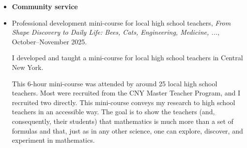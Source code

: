 \documentclass[12pt]{article}
\theoremstyle{plain} \numberwithin{equation}{section}
\theoremstyle{definition}
\begin{document}
\begin{itemize}
\begin{itemize}[label=\textbullet,leftmargin=1.4em,itemsep=-1pt,topsep=0pt,parsep=0pt,partopsep=0pt]
\item Advances in Applied Mathematics
\item Advances in Geometry
\item Advances in Mathematics
\item Advanced Nonlinear Studies
\item Bulletin des sciences math\'ematiques
\item Calculus of Variations and Partial Differential Equations
\item Discrete and Continuous Dynamical Systems Series S
\item Indagationes Mathematicae
\item International Mathematics Research Notices
\item Journal de Math\'ematiques Pures et Appliqu\'ees
\item Journal of Differential Geometry
\item Journal of Differential Equations
\item Journal of Geometric Analysis
\item Journal of Mathematical Analysis and Applications
\item Journal of the European Mathematical Society
\item Journal of the London Mathematical Society
\item Mathematische Annalen
\item Nonlinear Analysis
\item Proceedings of the American Mathematical Society
\item Rocky Mountain Journal of Mathematics
\item SCIENCE CHINA Mathematics
\item Transactions of the American Mathematical Society
\end{itemize}


\item[] \textbf{Community service}

\item Professional development mini-course for local high school teachers, \emph{From Shape Discovery to Daily Life: Bees, Cats, Engineering, Medicine, ...}, October--November 2025.

I developed and taught a mini-course for local high school teachers in Central New York.

	This 6-hour mini-course was attended by around 25 local high school teachers. Most were recruited from the CNY Master Teacher Program, and I recruited two directly. This mini-course conveys my research to high school teachers in an accessible way. The goal is to show the teachers (and, consequently, their students) that mathematics is much more than a set of formulas and that, just as in any other science, one can explore, discover, and experiment in mathematics.


\end{itemize}
\end{document}
